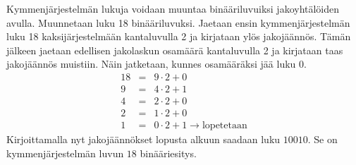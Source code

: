 \begin{kotitehtavasivu}
\begin{tehtava}
	Kymmenjärjestelmän lukuja voidaan muuntaa binääriluvuiksi jakoyhtälöiden avulla. Muunnetaan luku 18 binääriluvuksi. Jaetaan ensin kymmenjärjestelmän luku 18 kaksijärjestelmään kantaluvulla 2 ja kirjataan ylös jakojäännös. Tämän jälkeen jaetaan edellisen jakolaskun osamäärä kantaluvulla 2 ja kirjataan taas jakojäännös muistiin. Näin jatketaan, kunnes osamääräksi jää luku 0. 
	\begin{eqnarray*}
	18&=&9\cdot 2+0\\
	9&=&4\cdot 2+1\\
	4&=&2\cdot 2+0\\
	2&=&1\cdot 2+0\\
	1&=&0\cdot2+1 \to \textrm{lopetetaan}
	\end{eqnarray*}
	Kirjoittamalla nyt jakojäännökset lopusta alkuun saadaan luku $10010$. Se on kymmenjärjestelmän luvun $18$ binääriesitys.
\end{tehtava}

\end{kotitehtavasivu}

